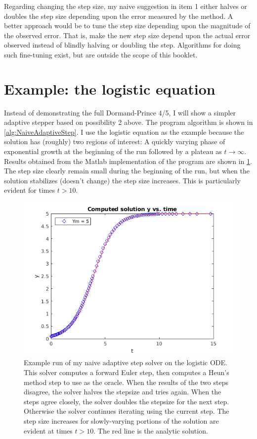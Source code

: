 \documentclass[hidelinks,notitlepage]{book}
\begin{document}
Regarding changing the step size, my naive suggestion in item 1 either halves or doubles the step size depending upon the error measured by the method.  A better approach would be to tune the step size depending upon the magnitude of the observed error.  That is, make the new step size depend upon the actual error observed instead of blindly halving or doubling the step.  Algorithms for doing such fine-tuning exist, but are outside the scope of this booklet.

\section{Example:  the logistic equation}
Instead of demonstrating the full Dormand-Prince 4/5, I will show a simpler adaptive stepper based on possibility 2 above.  The program algorithm is shown in \cref{alg:NaiveAdaptiveStep}.  I use the logistic equation as the example because the solution has (roughly) two regions of interest:  A quickly varying phase of exponential growth at the beginning of the run followed by a plateau as $t \rightarrow \infty$.   Results obtained from the Matlab implementation of the program are shown in \cref{fig:AdaptiveEHLogistic}.  The step size clearly remain small during the beginning of the run, but when the solution stabilizes (doesn't change) the step size increases.  This is particularly evident for times $t > 10$.
\begin{figure}[bh]
	\centering
	\includegraphics[width=0.7\columnwidth]{AdaptiveEHLogistic.png}
	\caption{Example run of my naive adaptive step solver on the logistic ODE.  This solver computes a forward Euler step, then computes a Heun's method step to use as the oracle.  When the results of the two steps disagree, the solver halves the stepsize and tries again.  When the steps agree closely, the solver doubles the stepsize for the next step.  Otherwise the solver continues iterating using the current step.  The step size increases for slowly-varying portions of the solution are evident at times $t > 10$.   The red line is the analytic solution.}
	\label{fig:AdaptiveEHLogistic}
\end{figure}
\end{document}
